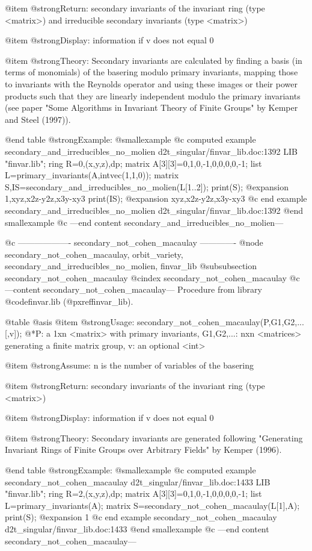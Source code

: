 @item @strong{Return:}
secondary invariants of the invariant ring (type <matrix>) and
irreducible secondary invariants (type <matrix>)

@item @strong{Display:}
information if v does not equal 0

@item @strong{Theory:}
Secondary invariants are calculated by finding a basis (in terms of
monomials) of the basering modulo primary invariants, mapping those to
invariants with the Reynolds operator and using these images or their
power products such that they are linearly independent modulo the
primary invariants (see paper "Some Algorithms in Invariant Theory of
Finite Groups" by Kemper and Steel (1997)).

@end table
@strong{Example:}
@smallexample
@c computed example secondary_and_irreducibles_no_molien d2t_singular/finvar_lib.doc:1392 
LIB "finvar.lib";
ring R=0,(x,y,z),dp;
matrix A[3][3]=0,1,0,-1,0,0,0,0,-1;
list L=primary_invariants(A,intvec(1,1,0));
matrix S,IS=secondary_and_irreducibles_no_molien(L[1..2]);
print(S);
@expansion{} 1,xyz,x2z-y2z,x3y-xy3
print(IS);
@expansion{} xyz,x2z-y2z,x3y-xy3
@c end example secondary_and_irreducibles_no_molien d2t_singular/finvar_lib.doc:1392
@end smallexample
@c ---end content secondary_and_irreducibles_no_molien---

@c ------------------- secondary_not_cohen_macaulay -------------
@node secondary_not_cohen_macaulay, orbit_variety, secondary_and_irreducibles_no_molien, finvar_lib
@subsubsection secondary_not_cohen_macaulay
@cindex secondary_not_cohen_macaulay
@c ---content secondary_not_cohen_macaulay---
Procedure from library @code{finvar.lib} (@pxref{finvar_lib}).

@table @asis
@item @strong{Usage:}
secondary_not_cohen_macaulay(P,G1,G2,...[,v]);
@*P: a 1xn <matrix> with primary invariants, G1,G2,...: nxn <matrices>
generating a finite matrix group, v: an optional <int>

@item @strong{Assume:}
n is the number of variables of the basering

@item @strong{Return:}
secondary invariants of the invariant ring (type <matrix>)

@item @strong{Display:}
information if v does not equal 0

@item @strong{Theory:}
Secondary invariants are generated following "Generating Invariant
Rings of Finite Groups over Arbitrary Fields" by Kemper (1996).

@end table
@strong{Example:}
@smallexample
@c computed example secondary_not_cohen_macaulay d2t_singular/finvar_lib.doc:1433 
LIB "finvar.lib";
ring R=2,(x,y,z),dp;
matrix A[3][3]=0,1,0,-1,0,0,0,0,-1;
list L=primary_invariants(A);
matrix S=secondary_not_cohen_macaulay(L[1],A);
print(S);
@expansion{} 1
@c end example secondary_not_cohen_macaulay d2t_singular/finvar_lib.doc:1433
@end smallexample
@c ---end content secondary_not_cohen_macaulay---

